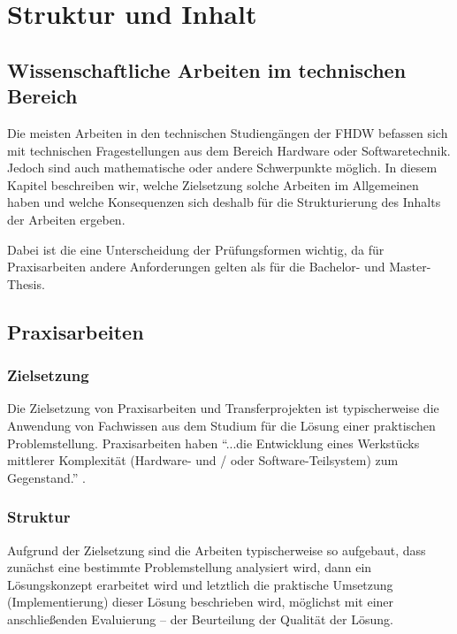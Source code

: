 \chapter{Struktur und Inhalt}
\label{chap:struktur-und-inhalt}


\section{Wissenschaftliche Arbeiten im technischen Bereich}

Die meisten Arbeiten in den technischen Studiengängen der FHDW befassen sich mit technischen Fragestellungen aus dem Bereich Hardware oder Softwaretechnik. Jedoch sind auch mathematische oder andere Schwerpunkte möglich. In diesem Kapitel beschreiben wir, welche Zielsetzung solche Arbeiten im Allgemeinen haben und welche Konsequenzen sich deshalb für die Strukturierung des Inhalts der Arbeiten ergeben.

Dabei ist die eine Unterscheidung der Prüfungsformen wichtig, da für Praxisarbeiten andere Anforderungen gelten als für die Bachelor- und Master-Thesis.

\section{Praxisarbeiten}

\subsection{Zielsetzung}

Die Zielsetzung von Praxisarbeiten und Transferprojekten ist typischerweise die Anwendung von Fachwissen aus dem Studium für die Lösung einer praktischen Problemstellung. Praxisarbeiten haben \enquote{...die Entwicklung eines Werkstücks mittlerer Komplexität
(Hardware- und / oder Software-Teilsystem) zum Gegenstand.} \cite[S.\,122]{FHDWModulhabdbuchBachelor}. 

\subsection{Struktur}
\label{sec:struktur-projektbericht}

Aufgrund der Zielsetzung sind die Arbeiten typischerweise so aufgebaut, dass zunächst eine bestimmte Problemstellung analysiert wird, dann ein Lösungskonzept erarbeitet wird und letztlich die praktische Umsetzung (Implementierung) dieser Lösung beschrieben wird, möglichst mit einer anschließenden Evaluierung -- der Beurteilung der Qualität der Lösung.

